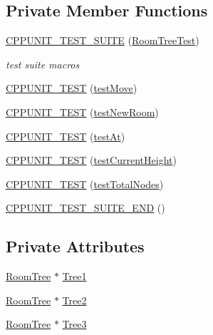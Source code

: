 \subsection*{Private Member Functions}
\begin{DoxyCompactItemize}
\item 
\hyperlink{classRoomTreeTest_a38df4c66be0d341a6d12fda7fdd1d6a4}{C\-P\-P\-U\-N\-I\-T\-\_\-\-T\-E\-S\-T\-\_\-\-S\-U\-I\-T\-E} (\hyperlink{classRoomTreeTest}{Room\-Tree\-Test})
\begin{DoxyCompactList}\small\item\em test suite macros \end{DoxyCompactList}\item 
\hyperlink{classRoomTreeTest_a0036ded2c0eebf44f7efe33a6599191e}{C\-P\-P\-U\-N\-I\-T\-\_\-\-T\-E\-S\-T} (\hyperlink{classRoomTreeTest_aab3dedfa3aaa0bfab811a8d0d8c8b7e0}{test\-Move})
\item 
\hyperlink{classRoomTreeTest_a3e253c371a946e2bc196ac4c83023c21}{C\-P\-P\-U\-N\-I\-T\-\_\-\-T\-E\-S\-T} (\hyperlink{classRoomTreeTest_a1f342a990eb4b60cfae96dac1dbbedee}{test\-New\-Room})
\item 
\hyperlink{classRoomTreeTest_a0eac4e16bb37465e894eb1a6ad74900e}{C\-P\-P\-U\-N\-I\-T\-\_\-\-T\-E\-S\-T} (\hyperlink{classRoomTreeTest_a7999cf9d9149ade6f39fbb7be601805e}{test\-At})
\item 
\hyperlink{classRoomTreeTest_a15f3666905d1c207aa1f90b445cb6f7f}{C\-P\-P\-U\-N\-I\-T\-\_\-\-T\-E\-S\-T} (\hyperlink{classRoomTreeTest_a67dd37f922aabba4fefe925cfbd8483a}{test\-Current\-Height})
\item 
\hyperlink{classRoomTreeTest_aa665ae61a669fecbdc3db4cb06c47767}{C\-P\-P\-U\-N\-I\-T\-\_\-\-T\-E\-S\-T} (\hyperlink{classRoomTreeTest_a59d8363440d55c68ef79109efe88a5f5}{test\-Total\-Nodes})
\item 
\hyperlink{classRoomTreeTest_a22c287ede74b7fc2591ceee86d10d85a}{C\-P\-P\-U\-N\-I\-T\-\_\-\-T\-E\-S\-T\-\_\-\-S\-U\-I\-T\-E\-\_\-\-E\-N\-D} ()
\end{DoxyCompactItemize}
\subsection*{Private Attributes}
\begin{DoxyCompactItemize}
\item 
\hyperlink{classRoomTree}{Room\-Tree} $\ast$ \hyperlink{classRoomTreeTest_aba5c37d20a82bff695de4c78a547f23f}{Tree1}
\item 
\hyperlink{classRoomTree}{Room\-Tree} $\ast$ \hyperlink{classRoomTreeTest_aada805154b8f5306805936f0ba43834c}{Tree2}
\item 
\hyperlink{classRoomTree}{Room\-Tree} $\ast$ \hyperlink{classRoomTreeTest_aa70878ec1fa44e95f78e59a236572b27}{Tree3}
\end{DoxyCompactItemize}


